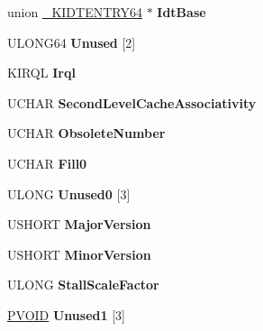 \begin{DoxyCompactItemize}
\begin{tabbing}
\end{tabbing}\item 
\mbox{\label{struct___k_i_p_c_r_ad5b78368b708b0546186d3e2c2b2faa2}} 
union \hyperlink{union___k_i_d_t_e_n_t_r_y64}{\+\_\+\+K\+I\+D\+T\+E\+N\+T\+R\+Y64} $\ast$ {\bfseries Idt\+Base}
\item 
\mbox{\label{struct___k_i_p_c_r_afc5455cb805d31af1346d324a0efd68f}} 
U\+L\+O\+N\+G64 {\bfseries Unused} \mbox{[}2\mbox{]}
\item 
\mbox{\label{struct___k_i_p_c_r_a349006dc7c5d56e7248c3c7d16a7bbdf}} 
K\+I\+R\+QL {\bfseries Irql}
\item 
\mbox{\label{struct___k_i_p_c_r_a22363f774c0ca338bcf1715fdd028556}} 
U\+C\+H\+AR {\bfseries Second\+Level\+Cache\+Associativity}
\item 
\mbox{\label{struct___k_i_p_c_r_aa1d444b0dc9f9de9bb0874d9a9e6bfb2}} 
U\+C\+H\+AR {\bfseries Obsolete\+Number}
\item 
\mbox{\label{struct___k_i_p_c_r_a581408824657c64f97b1796ba7c41afa}} 
U\+C\+H\+AR {\bfseries Fill0}
\item 
\mbox{\label{struct___k_i_p_c_r_a768bf33b224cbd7503702b6348cd9b6e}} 
U\+L\+O\+NG {\bfseries Unused0} \mbox{[}3\mbox{]}
\item 
\mbox{\label{struct___k_i_p_c_r_a2168c26f63b8c38ec3075a00fb3f89e4}} 
U\+S\+H\+O\+RT {\bfseries Major\+Version}
\item 
\mbox{\label{struct___k_i_p_c_r_a0d9930c8dee9ad74354fb977375f8e1d}} 
U\+S\+H\+O\+RT {\bfseries Minor\+Version}
\item 
\mbox{\label{struct___k_i_p_c_r_ae9d99d35af1bd465927295e9b2d708c3}} 
U\+L\+O\+NG {\bfseries Stall\+Scale\+Factor}
\item 
\mbox{\label{struct___k_i_p_c_r_a9f9d46fcfa6a7e4a8d50e746de2a5110}} 
\hyperlink{interfacevoid}{P\+V\+O\+ID} {\bfseries Unused1} \mbox{[}3\mbox{]}

\end{DoxyCompactItemize}
